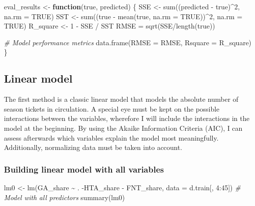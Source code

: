 \documentclass[
]{article}
\newenvironment{Shaded}{\begin{snugshade}}{\end{snugshade}}
\newcommand{\AttributeTok}[1]{\textcolor[rgb]{0.77,0.63,0.00}{#1}}
\newcommand{\CommentTok}[1]{\textcolor[rgb]{0.56,0.35,0.01}{\textit{#1}}}
\newcommand{\ConstantTok}[1]{\textcolor[rgb]{0.00,0.00,0.00}{#1}}
\newcommand{\ControlFlowTok}[1]{\textcolor[rgb]{0.13,0.29,0.53}{\textbf{#1}}}
\newcommand{\DecValTok}[1]{\textcolor[rgb]{0.00,0.00,0.81}{#1}}
\newcommand{\FunctionTok}[1]{\textcolor[rgb]{0.00,0.00,0.00}{#1}}
\newcommand{\NormalTok}[1]{#1}
\newcommand{\OtherTok}[1]{\textcolor[rgb]{0.56,0.35,0.01}{#1}}
\newcommand{\SpecialCharTok}[1]{\textcolor[rgb]{0.00,0.00,0.00}{#1}}
\begin{document}
\begin{Shaded}
\begin{Highlighting}[]
\NormalTok{eval\_results }\OtherTok{\textless{}{-}} \ControlFlowTok{function}\NormalTok{(true, predicted) \{}
\NormalTok{  SSE }\OtherTok{\textless{}{-}} \FunctionTok{sum}\NormalTok{((predicted }\SpecialCharTok{{-}}\NormalTok{ true)}\SpecialCharTok{\^{}}\DecValTok{2}\NormalTok{, }\AttributeTok{na.rm =} \ConstantTok{TRUE}\NormalTok{)}
\NormalTok{  SST }\OtherTok{\textless{}{-}} \FunctionTok{sum}\NormalTok{((true }\SpecialCharTok{{-}} \FunctionTok{mean}\NormalTok{(true, }\AttributeTok{na.rm =} \ConstantTok{TRUE}\NormalTok{))}\SpecialCharTok{\^{}}\DecValTok{2}\NormalTok{, }\AttributeTok{na.rm =} \ConstantTok{TRUE}\NormalTok{)}
\NormalTok{  R\_square }\OtherTok{\textless{}{-}} \DecValTok{1} \SpecialCharTok{{-}}\NormalTok{ SSE }\SpecialCharTok{/}\NormalTok{ SST}
\NormalTok{  RMSE }\OtherTok{=} \FunctionTok{sqrt}\NormalTok{(SSE}\SpecialCharTok{/}\FunctionTok{length}\NormalTok{(true))}

\CommentTok{\# Model performance metrics}
\FunctionTok{data.frame}\NormalTok{(}\AttributeTok{RMSE =}\NormalTok{ RMSE,}
           \AttributeTok{Rsquare =}\NormalTok{ R\_square)}
\NormalTok{\}}
\end{Highlighting}
\end{Shaded}

\hypertarget{linear-model}{%
\subsection{Linear model}\label{linear-model}}

The first method is a classic linear model that models the absolute
number of season tickets in circulation. A special eye must be kept on
the possible interactions between the variables, wherefore I will
include the interactions in the model at the beginning. By using the
Akaike Information Criteria (AIC), I can assess afterwards which
variables explain the model most meaningfully. Additionally, normalizing
data must be taken into account.

\hypertarget{building-linear-model-with-all-variables}{%
\subsubsection{Building linear model with all
variables}\label{building-linear-model-with-all-variables}}

\begin{Shaded}
\begin{Highlighting}[]
\NormalTok{lm0 }\OtherTok{\textless{}{-}} \FunctionTok{lm}\NormalTok{(GA\_share }\SpecialCharTok{\textasciitilde{}}\NormalTok{ . }\SpecialCharTok{{-}}\NormalTok{HTA\_share }\SpecialCharTok{{-}}\NormalTok{ FNT\_share, }\AttributeTok{data =}\NormalTok{ d.train[, }\DecValTok{4}\SpecialCharTok{:}\DecValTok{45}\NormalTok{]) }\CommentTok{\# Model with all predictors}
\FunctionTok{summary}\NormalTok{(lm0)}
\end{Highlighting}
\end{Shaded}
\end{document}
